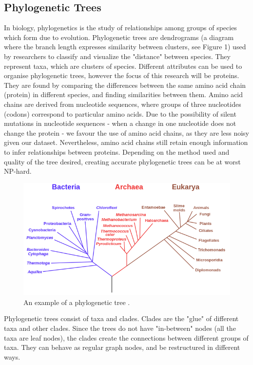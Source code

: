 \documentclass{mpaper}
\begin{document}
\subsection{Phylogenetic Trees}

In biology, phylogenetics is the study of relationships among groups of species which form due to evolution. Phylogenetic trees are dendrograms (a diagram where the branch length expresses similarity between clusters, see Figure 1) used by researchers to classify and visualize the "distance" between species. They represent taxa, which are clusters of species. Different attributes can be used to organise phylogenetic trees, however the focus of this research will be proteins. They are found by comparing the differences between the same amino acid chain (protein) in different species, and finding similarities between them. Amino acid chains are derived from nucleotide sequences, where groups of three nucleotides (codons) correspond to particular amino acids. Due to the possibility of silent mutations in nucleotide sequences - when a change in one nucleotide does not change the protein - we favour the use of amino acid chains, as they are less noisy given our dataset. Nevertheless, amino acid chains still retain enough information to infer relationships between proteins. Depending on the method used and quality of the tree desired, creating accurate phylogenetic trees can be at worst NP-hard.

\begin{figure}[h]
    \includegraphics[width=1\linewidth]{images/Phylogenetic_tree_example}
    \centering
    \caption{An example of a phylogenetic tree \cite{enwiki:1187886462}.}
\end{figure}

Phylogenetic trees consist of taxa and clades. Clades are the "glue" of different taxa and other clades. Since the trees do not have "in-between" nodes (all the taxa are leaf nodes), the clades create the connections between different groups of taxa. They can behave as regular graph nodes, and be restructured in different ways.
\end{document}
